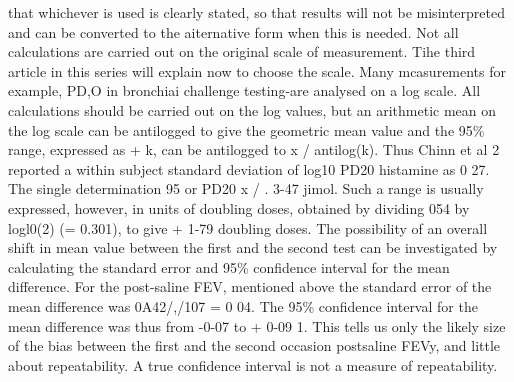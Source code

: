 \documentclass[MAIN.tex]{subfiles}
\begin{document}
that whichever is used is clearly stated, so that
results will not be misinterpreted and can be
converted to the aiternative form when this is
needed.
\newpage
Not all calculations are carried out on the original scale of measurement. Tihe third
article in this series will explain now to choose
the scale. Many mcasurements for example,
PD,O in bronchiai challenge testing-are
analysed on a log scale. All calculations should
be carried out on the log values, but an
arithmetic mean on the log scale can be
antilogged to give the geometric mean value
and the 95\% range, expressed as + k, can be
antilogged to x / antilog(k). Thus Chinn et
al 2 reported a within subject standard deviation
of log10 PD20 histamine as 0 27. The
single determination 95%
or PD20 x / . 3-47 jimol. Such a range
is usually expressed, however, in units of
doubling doses, obtained by dividing 054 by
logl0(2) (= 0.301), to give + 1-79 doubling
doses.
The possibility of an overall shift in mean
value between the first and the second test can
be investigated by calculating the standard
error and 95\% confidence interval for the
mean difference. For the post-saline FEV,
mentioned above the standard error of the
mean difference was 0A42/,/107 = 0 04. The
95\% confidence interval for the mean difference
was thus from -0-07 to + 0-09 1.
This tells us only the likely size of the bias
between the first and the second occasion postsaline
FEVy, and little about repeatability. A
true confidence interval is not a measure of
repeatability.
\end{document}
